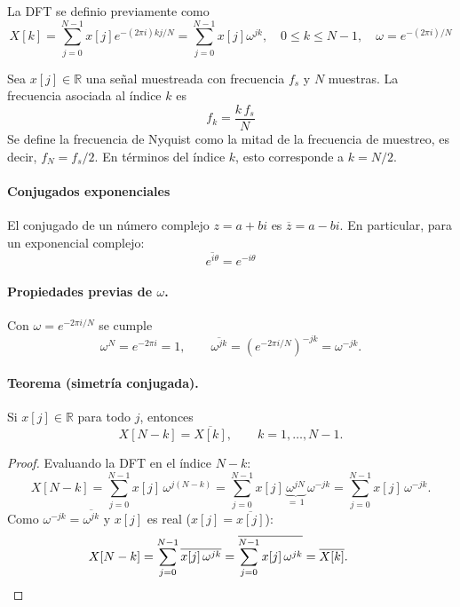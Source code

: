 \documentclass[12pt]{article}
\begin{document}
\newpage
La DFT se definio previamente como
$$
X[k]= \sum_{j=0}^{N-1} x[j] e^{-(2\pi i) k j  / N}=\sum_{j=0}^{N-1} x[j] \omega^{ jk }, \quad 0 \le k \le N-1, \quad \omega = e^{-(2\pi i) / N}
$$

Sea $x[j]\in\mathbb{R}$ una señal muestreada con frecuencia $f_s$ y $N$ muestras. La frecuencia asociada al índice $k$ es
\begin{equation}
f_k = \frac{k\,f_s}{N}
\end{equation}
Se define la frecuencia de Nyquist como la mitad de la frecuencia de muestreo, es decir, $f_N = f_s/2$. En términos del índice $k$, esto corresponde a $k = N/2$.

\paragraph{Conjugados exponenciales} 
El conjugado de un número complejo $z = a + bi$ es $\overline{z} = a - bi$. En particular, para un exponencial complejo:
\begin{equation}
\overline{e^{i\theta}} = e^{-i\theta}
\end{equation}
\paragraph{Propiedades previas de $\omega$.} Con $\omega = e^{-2\pi i/N}$ se cumple
\begin{equation}
\omega^{N} = e^{-2\pi i} = 1, \qquad
\overline{\omega^{jk}} = \left(e^{-2\pi i/N}\right)^{-jk} = \omega^{-jk}.
\end{equation}

\paragraph{Teorema (simetría conjugada).} Si $x[j]\in\mathbb{R}$ para todo $j$, entonces
\begin{equation}
X[N-k] = \overline{X[k]}, \qquad k = 1,\ldots,N-1.
\end{equation}

\begin{proof}
Evaluando la DFT en el índice $N-k$:
\begin{equation}
X[N-k] = \sum_{j=0}^{N-1} x[j]\,\omega^{j(N-k)}
       = \sum_{j=0}^{N-1} x[j]\,\underbrace{\omega^{jN}}_{=\,1}\,\omega^{-jk}
       = \sum_{j=0}^{N-1} x[j]\,\omega^{-jk}.
\end{equation}
Como $\omega^{-jk} = \overline{\omega^{jk}}$ y $x[j]$ es real ($x[j]=\overline{x[j]}$):
\begin{equation}
X[N-k] = \sum_{j=0}^{N-1} \overline{x[j]\,\omega^{jk}}
       = \overline{\sum_{j=0}^{N-1} x[j]\,\omega^{jk}}
       = \overline{X[k]}. \qquad \qedhere
\end{equation}
\end{proof}
\end{document}
